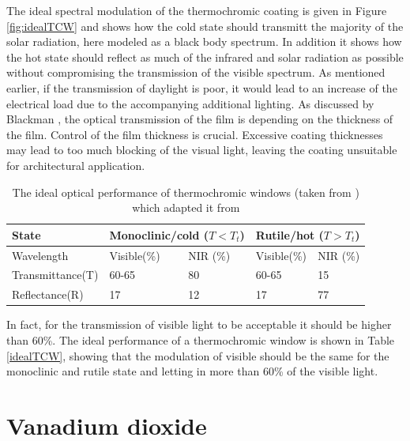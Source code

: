 The ideal spectral modulation of the thermochromic coating is given in Figure \ref{fig:idealTCW} and
shows how the cold state should transmitt the majority of the solar radiation, here modeled
as a black body spectrum. In addition it shows how the hot state should reflect as much 
of the infrared and solar radiation as possible without compromising the transmission of the 
visible spectrum. As mentioned earlier, if the transmission of daylight is poor, it would 
lead to an increase of the electrical load due to the accompanying additional lighting.
\cite{McCluney1996}
%
As discussed by Blackman \cite{Blackman2009},
the optical transmission of the film is depending on the thickness of the film. Control of the film
thickness is crucial. Excessive coating thicknesses may lead to too much blocking of the visual light,
leaving the coating unsuitable for architectural application.
%
%
\begin{table}[htbp]
   \caption{The ideal optical performance of thermochromic windows (taken from \cite{Kamalisarvestani2013})
   which adapted it from \cite{Saeli2010}}
\centering
\begin{tabular}{ l l l l l}
\hline
\textbf{State}  &  \multicolumn{2}{l}{\textbf{Monoclinic/cold ($T<T_t$)}}  &  \multicolumn{2}{l}{\textbf{Rutile/hot ($T>T_t$)}} \\
\hline
Wavelength      &  Visible(\%)    &  NIR (\%)      &  Visible(\%)    &  NIR (\%) \\
Transmittance(T)&  60-65          &  80            &  60-65          &  15       \\
Reflectance(R)  &  17             &  12            &  17             &  77       \\
\hline
\end{tabular}
\label{tab:idealTCW}
\end{table}
%
In fact, for the transmission of visible light to be acceptable it should be higher than 60\%.
The ideal performance of a thermochromic window is shown in Table \ref{idealTCW}, showing 
that the modulation of visible should be the same for the monoclinic and rutile state and 
letting in more than 60\% of the visible light.



\section{Vanadium dioxide}

